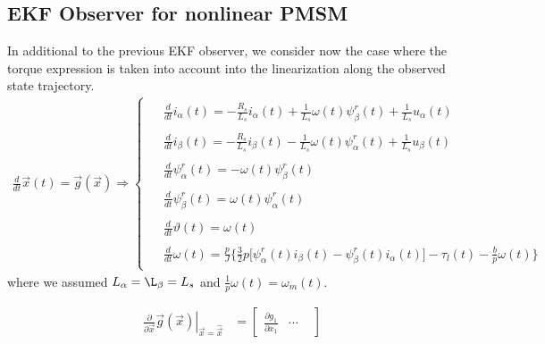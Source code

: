 \documentclass[11pt,a4paper]{scrartcl}
\numberwithin{equation}{section}
\theoremstyle{it}
\theoremstyle{definition}
\begin{document}
\begin{onehalfspace}
\subsection{EKF Observer for nonlinear PMSM}
In additional to the previous EKF observer, we consider now the case where the torque expression is taken into account into the linearization along the observed state trajectory.
\begin{align}\label{}
	\frac{d}{dt}\vec{x}(t)=\vec{g}(\vec{x})\Rightarrow\left\lbrace 
	\begin{aligned}
		\begin{split}
			&\frac{d}{dt}i_\alpha(t) = -\frac{R_s}{L_s}i_\alpha(t) + 	
			\frac{1}{L_s}\omega(t)\psi_\beta^r(t) + \frac{1}{L_s} u_\alpha(t) 
		\end{split}	\\[6pt]
		\begin{split}
			&\frac{d}{dt}i_\beta(t) = -\frac{R_s}{L_s}i_\beta(t) - 	
			\frac{1}{L_s}\omega(t)\psi_\alpha^r(t) + \frac{1}{L_s} u_\beta(t)	
		\end{split}	\\[6pt]
		\begin{split}
			&\frac{d}{dt}\psi_\alpha^r(t) = -\omega(t)\psi_\beta^r(t)
		\end{split}	\\[6pt]
		\begin{split}	
			&\frac{d}{dt}\psi_\beta^r(t) = \omega(t)\psi_\alpha^r(t)	
		\end{split}	\\[6pt]
		\begin{split}
			&\frac{d}{dt}\vartheta(t) = \omega(t)
		\end{split}	\\[6pt]
		\begin{split}
			&\frac{d}{dt}\omega(t) = 
			\frac{p}{J}\Bigg\{\frac{3}{2}p\Big[\psi^r_{\alpha}(t)i_{\beta}(t) - 
			\psi^r_{\beta}(t)i_{\alpha}(t)\Big] - \tau_l(t) 
			-\frac{b}{p}\omega(t)\Bigg\}
		\end{split}
	\end{aligned}\right. 
\end{align}
where we assumed $L_\alpha = \L_\beta = L_s$ and $\frac{1}{p}\omega(t) = \omega_m(t)$.
\begin{mybox}
	\begin{equation}\label{}
		\begin{aligned}
			\left.\frac{\partial}{\partial 
				\vec{x}}\vec{g}(\vec{x})\right|_{\vec{x}=\hat{\vec{x}}} &= 
			\begin{bmatrix} \frac{\partial g_1}{\partial x_1} & \cdots & 

\end{bmatrix}
\end{aligned}
\end{equation}
\end{mybox}
\end{onehalfspace}
\end{document}
